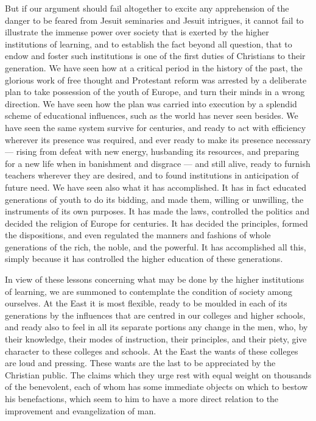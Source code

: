 \documentclass[]{book}
\begin{document}
But if our argument should fail altogether to excite any apprehension of the danger to be feared from Jesuit seminaries and Jesuit intrigues, it cannot fail to illustrate the immense power over society that is exerted by the higher institutions of learning, and to establish the fact beyond all question, that to endow and foster such institutions is one of the first duties of Christians to their generation. We have seen how at a critical period in the history of the past, the glorious work of free thought and Protestant reform was arrested by a deliberate plan to take possession of the youth of Europe, and turn their minds in a wrong direction. We have seen how the plan was carried into execution by a splendid scheme of educational influences, such as the world has never seen besides. We have seen the same system survive for centuries, and ready to act with efficiency wherever its presence was required, and ever ready to make its presence necessary --- rising from defeat with new energy, husbanding its resources, and preparing for a new life when in banishment and disgrace --- and still alive, ready to furnish teachers wherever they are desired, and to found institutions in anticipation of future need. We have seen also what it has accomplished. It has in fact educated generations of youth to do its bidding, and made them, willing or unwilling, the instruments of its own purposes. It has made the laws, controlled the politics and decided the religion of Europe for centuries. It has decided the principles, formed the dispositions, and even regulated the manners and fashions of whole generations of the rich, the noble, and the powerful. It has accomplished all this, simply because it has controlled the higher education of these generations.

In view of these lessons concerning what may be done by the higher institutions of learning, we are summoned to contemplate the condition of society among ourselves. At the East it is most flexible, ready to be moulded in each of its generations by the influences that are centred in our colleges and higher schools, and ready also to feel in all its separate portions any change in the men, who, by their knowledge, their modes of instruction, their principles, and their piety, give character to these colleges and schools. At the East the wants of these colleges are loud and pressing. These wants are the last to be appreciated by the Christian public. The claims which they urge rest with equal weight on thousands of the benevolent, each of whom has some immediate objects on which to bestow his benefactions, which seem to him to have a more direct relation to the improvement and evangelization of man.
\end{document}
